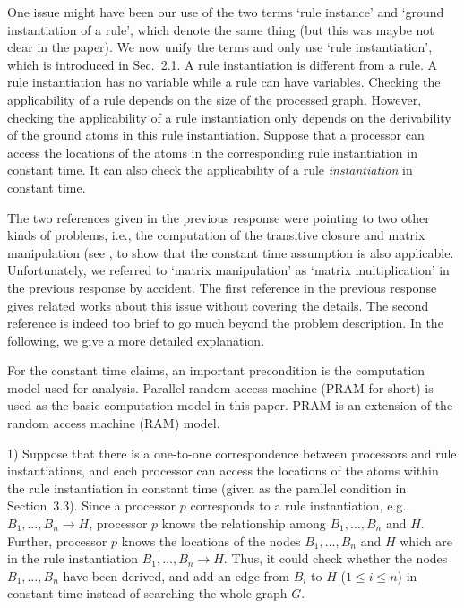\documentclass{article}
\begin{document}
One issue might have been our use of the two terms `rule instance'
and `ground instantiation of a rule', which denote the same thing (but
this was maybe not clear in the paper).
We now unify the terms and only use `rule instantiation', which is introduced
in Sec.~2.1. A rule instantiation is different from a rule.
A rule instantiation has no variable while a rule can have variables.
Checking the applicability of a rule depends on the size of the
processed graph. However, checking the applicability of a rule
instantiation only depends on the derivability of the ground atoms
in this rule instantiation. Suppose that a processor can access the
locations of the atoms in the corresponding rule instantiation in constant time.
It can also check the applicability of a rule \emph{instantiation} in constant time.

The two references given in the previous response were pointing to two
other kinds of problems, i.e., the computation of the transitive
closure and matrix manipulation (see
\cite[Part~\uppercase\expandafter{}~A]{Raymond95}, to
show that the constant time assumption is also
applicable. Unfortunately, we referred to `matrix manipulation' as
`matrix multiplication' in the previous response by accident. The
first reference in the previous response gives related works about
this issue without covering the details. The second reference is
indeed too brief to go much beyond the problem description. In the
following, we give a more detailed explanation.

For the constant time claims, an important precondition is the
computation model used for analysis. Parallel random access machine
(PRAM for short) is used as the basic computation model in this
paper. PRAM is an extension of the random access machine (RAM) model.

1) Suppose that there is a one-to-one correspondence between
processors and rule instantiations, and each processor can access the
locations of the atoms within the rule instantiation in constant time
(given as the parallel condition in Section~3.3). Since a processor
$p$ corresponds to a rule instantiation, e.g.,
$B_1, \ldots, B_n \to H$, processor $p$ knows the relationship among
$B_1, \ldots, B_n$ and $H$. Further, processor $p$ knows the locations
of the nodes $B_1, \ldots, B_n$ and $H$ which are in the rule instantiation $B_1, \ldots, B_n \to H$.
Thus, it could check whether the nodes $B_1, \ldots, B_n$ have been derived,
and add an edge from $B_i$ to $H$ ($1 \leq i \leq n$) in constant time instead of searching the whole
graph $G$.
\end{document}
